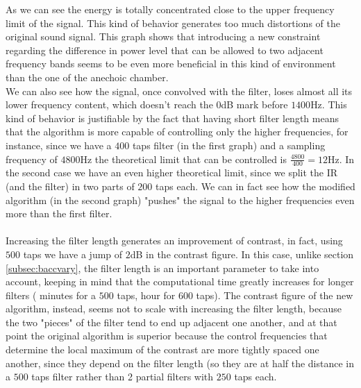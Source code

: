 As we can see the energy is totally concentrated close to the upper frequency limit of the signal. This kind of behavior generates too much distortions of the original sound signal. This graph shows that introducing a new constraint regarding the difference in power level that can be allowed to two adjacent frequency bands seems to be even more beneficial in this kind of environment than the one of the anechoic chamber.
\\
We can also see how the signal, once convolved with the filter, loses almost all its lower frequency content, which doesn't reach the $0$dB mark before $1400$Hz. This kind of behavior is justifiable by the fact that having short filter length means that the algorithm is more capable of controlling only the higher frequencies, for instance, since we have a $400$ taps filter (in the first graph) and a sampling frequency of $4800$Hz the theoretical limit that can be controlled is $\frac{4800}{400}=12$Hz. In the second case we have an even higher theoretical limit, since we split the IR (and the filter) in two parts of $200$ taps each. We can in fact see how the modified algorithm (in the second graph) "pushes" the signal to the higher frequencies even more than the first filter.
\\
\\
Increasing the filter length generates an improvement of contrast, in fact, using $500$ taps we have a jump of \tld$2$dB in the contrast figure. In this case, unlike section \ref{subsec:baccvary}, the filter length is an important parameter to take into account, keeping in mind that the computational time greatly increases for longer filters ( minutes for a $500$ taps,  hour for $600$ taps).
The contrast figure of the new algorithm, instead, seems not to scale with increasing the filter length, because the two "pieces" of the filter tend to end up adjacent one another, and at that point the original algorithm is superior because the control frequencies that determine the local maximum of the contrast are more tightly spaced one another, since they depend on the filter length (so they are at half the distance in a $500$ taps filter rather than 2 partial filters with $250$ taps each.
